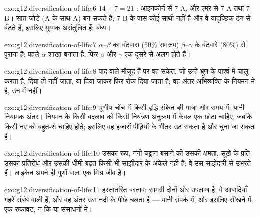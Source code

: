 \begin{solution}{exo:g12:diversification-of-life:6}
$14 + 7 = 21$ : आइनकोर्न से 7 A, और एमर से 7 A तथा 7 B। सात जोड़े
(A के साथ A) बन सकते हैं; 7 B  के पास कोई साथी नहीं है और वे
यादृच्छिक ढंग से बँटते हैं, इसलिए युग्मक असंतुलित हैं: बंध्य।
\end{solution}

\begin{solution}{exo:g12:diversification-of-life:7}
$\alpha$--$\beta$ का बँटवारा (50\% समरूप) $\beta$--$\gamma$ के बँटवारे
(80\%) से पुराना है: पहले $\alpha$ शाखा बनाता है, फिर $\beta$ और $\gamma$
एक-दूसरे से अलग होते हैं।
\end{solution}

\begin{solution}{exo:g12:diversification-of-life:8}
पाद वाले  मौजूद हैं पर वह संकेत, जो उन्हें भ्रूण के पार्श्व में चालू
करता है, दिया ही नहीं जाता, या दिया जाकर फिर रोक दिया जाता है; वह अंतर
अभिव्यक्ति के नियमन में है, उन  में नहीं।
\end{solution}

\begin{solution}{exo:g12:diversification-of-life:9}
भ्रूणीय चोंच में किसी वृद्धि संकेत की मात्रा और समय में: यानी नियामक अंतर।
नियमन के किसी बदलाव को किसी नियंत्रण अनुक्रम में केवल एक छोटा 
चाहिए, जबकि किसी नए  को बहुत-से चाहिए होते; इसलिए वह हज़ारों पीढ़ियों
के भीतर उठ सकता है और चुना जा सकता है।
\end{solution}

\begin{solution}{exo:g12:diversification-of-life:10}
उसका रूप, नंगी चट्टान बसाने की उसकी क्षमता, सूखे के प्रति उसका प्रतिरोध और
उसकी धीमी बढ़त किसी भी साझीदार के अकेले नहीं हैं; वे उस साझेदारी से उभरते
हैं। लाइकेन अपने ही गुणों वाला एक मिश्र जीव है।
\end{solution}

\begin{solution}{exo:g12:diversification-of-life:11}
हस्तांतरित बरताव: सामग्री दोनों ओर उपलब्ध है, वे आबादियाँ गहरे संबंध वाली
हैं, और वह अंतर उस नदी के पीछे चलता है --- यानी संपर्क में, और इसलिए सीखने
में, एक रुकावट, न कि  या संसाधनों में।
\end{solution}

